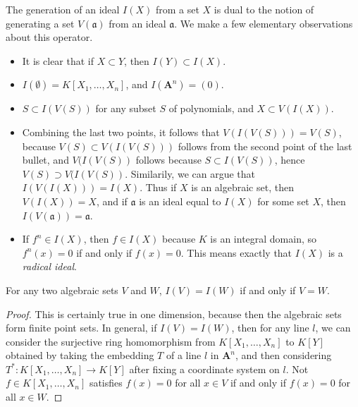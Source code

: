 The generation of an ideal $I(X)$ from a set $X$ is dual to the notion of generating a set $V(\mathfrak{a})$ from an ideal $\mathfrak{a}$. We make a few elementary observations about this operator.
%
\begin{itemize}
    \item It is clear that if $X \subset Y$, then $I(Y) \subset I(X)$.
    \item $I(\emptyset) = K[X_1, \dots, X_n]$, and $I(\mathbf{A}^n) = (0)$.
    \item $S \subset I(V(S))$ for any subset $S$ of polynomials, and $X \subset V(I(X))$.
    \item Combining the last two points, it follows that $V(I(V(S))) = V(S)$, because $V(S) \subset V(I(V(S)))$ follows from the second point of the last bullet, and $V(I(V(S))$ follows because $S \subset I(V(S))$, hence $V(S) \supset V(I(V(S))$. Similarily, we can argue that $I(V(I(X))) = I(X)$. Thus if $X$ is an algebraic set, then $V(I(X)) = X$, and if $\mathfrak{a}$ is an ideal equal to $I(X)$ for some set $X$, then $I(V(\mathfrak{a})) = \mathfrak{a}$.
    \item If $f^n \in I(X)$, then $f \in I(X)$ because $K$ is an integral domain, so $f^n(x) = 0$ if and only if $f(x) = 0$. This means exactly that $I(X)$ is a {\it radical ideal}.
\end{itemize}

\begin{prop}
    For any two algebraic sets $V$ and $W$, $I(V) = I(W)$ if and only if $V = W$.
\end{prop}
\begin{proof}
    This is certainly true in one dimension, because then the algebraic sets form finite point sets. In general, if $I(V) = I(W)$, then for any line $l$, we can consider the surjective ring homomorphism from $K[X_1, \dots,X_n]$ to $K[Y]$ obtained by taking the embedding $T$ of a line $l$ in $\mathbf{A}^n$, and then considering $T^*: K[X_1, \dots, X_n] \to K[Y]$ after fixing a coordinate system on $l$. Not $f \in K[X_1, \dots, X_n]$ satisfies $f(x) = 0$ for all $x \in V$ if and only if $f(x) = 0$ for all $x \in W$.
\end{proof}

